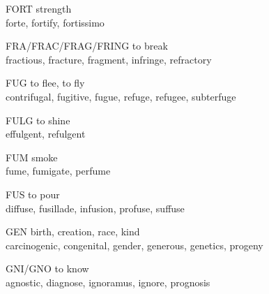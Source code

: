 \begin{flashcard}[Roots]{FORT}
strength\\
\vspace{0.2in}
forte, fortify, fortissimo\\
\end{flashcard}

\begin{flashcard}[Roots]{FRA/FRAC/FRAG/FRING}
to break\\
\vspace{0.2in}
fractious, fracture, fragment, infringe, refractory\\
\end{flashcard}

\begin{flashcard}[Roots]{FUG}
to flee, to fly\\
\vspace{0.2in}
contrifugal, fugitive, fugue, refuge, refugee, subterfuge\\
\end{flashcard}

\begin{flashcard}[Roots]{FULG}
to shine\\
\vspace{0.2in}
effulgent, refulgent\\
\end{flashcard}

\begin{flashcard}[Roots]{FUM}
smoke\\
\vspace{0.2in}
fume, fumigate, perfume\\
\end{flashcard}

\begin{flashcard}[Roots]{FUS}
to pour\\
\vspace{0.2in}
diffuse, fusillade, infusion, profuse, suffuse\\
\end{flashcard}

\begin{flashcard}[Roots]{GEN}
birth, creation, race, kind\\
\vspace{0.2in}
carcinogenic, congenital, gender, generous, genetics, progeny\\
\end{flashcard}

\begin{flashcard}[Roots]{GNI/GNO}
to know\\
\vspace{0.2in}
agnostic, diagnose, ignoramus, ignore, prognosis\\
\end{flashcard}

